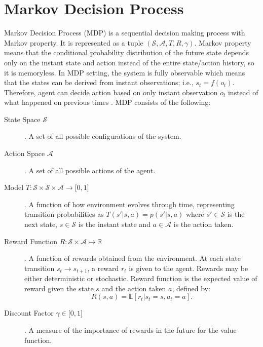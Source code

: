 \section{Markov Decision Process}
\label{sec:mdp}

Markov Decision Process (MDP) is a sequential decision making process with Markov property. 
It is represented as a tuple $(\mathcal{S},\mathcal{A},T,R,\gamma)$. 
Markov property means that the conditional probability distribution of the future state depends only on the instant state and action instead of the entire state/action history, so it is memoryless. 
In MDP setting, the system is fully observable which means that the states can be derived from instant observations; i.e., $s_t=f(o_t)$. 
Therefore, agent can decide action based on only instant observation $o_t$ instead of what happened on previous times \cite{francois-lavet_introduction_2018}. MDP consists of the following:

\begin{description}
	\item[State Space $\mathcal{S}$]. A set of all possible configurations of the system. 
	
	\item[Action Space $\mathcal{A}$].  A set of all possible actions of the agent. 
	
	\item[Model $T \colon \mathcal{S} \times \mathcal{S} \times \mathcal{A} \rightarrow \lbrack 0,1 \rbrack$]. A function of how environment evolves through time, representing transition probabilities as $T(s'|s,a) = p(s'|s,a)$ 
	where $s' \in \mathcal{S}$ is the next state, $s \in \mathcal{S}$ is the instant state and $a \in \mathcal{A}$ is the action taken.
	
	\item[Reward Function $R \colon \mathcal{S} \times \mathcal{A} \mapsto \mathbb{R}$]. A function of rewards obtained from the environment. 
	At each state transition $s_t \rightarrow s_{t+1}$, a reward $r_t$ is given to the agent. 
	Rewards may be either deterministic or stochastic. 
	Reward function is the expected value of reward given the state $s$ and the action taken $a$, defined by:
	\begin{equation}
	R(s,a) = \mathbb{E}[r_t|s_t=s, a_t=a]. %
	\end{equation}
	
	\item[Discount Factor $\gamma \in \lbrack 0,1 \rbrack$]. A measure of the importance of rewards in the future for the value function.
\end{description}
